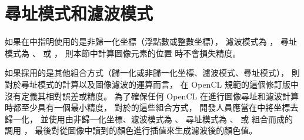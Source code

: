 \section[sec:addressFilterMode]{尋址模式和濾波模式}







\startnotepar
如果在中指明使用的是非歸一化坐標（浮點數或整數坐標），
濾波模式為 ，
尋址模式為 、 
或 ，
則本節中計算圖像元素的位置  時不會損失精度。
\stopnotepar

如果採用的是其他組合方式（歸一化或非歸一化坐標、濾波模式、尋址模式），
則對於尋址模式的計算以及圖像濾波的運算而言，
在 OpenCL 規範的這個修訂版中沒有定義其相對誤差或精度。
為了確保任何 OpenCL 在進行圖像尋址和濾波計算時都至少具有一個最小精度，
對於的這些組合方式，
開發人員應當在中將坐標去歸一化，
並使用由非歸一化坐標、濾波模式為 、
尋址模式為 、 
或  組合而成的
調用 ，
最後對從圖像中讀到的顏色進行插值來生成濾波後的顏色值。
